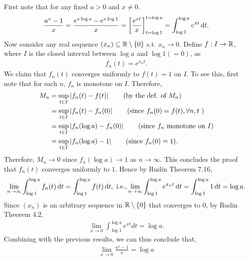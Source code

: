 \documentclass[12pt]{article}
\begin{document}
\begin{fproof}[1(a)]
 First note that for any fixed \(a > 0\) and \(x \neq 0\).
 \begin{align*}
    \frac{a^x - 1}{x} = \frac{e^{x \log a} - e^{x \log 1}}{x} = \left[ \frac{e^{xt}}{x} \right]_{t= \log 1}^{t= \log a} = \int_{\log 1}^{\log a} e^{x t} \mathop{}\!\mathrm{d} t.
 \end{align*}
 Now consider any real sequence \((x_n) \subseteq \mathbb {R} \setminus \{0\}\) s.t. \(x_n \to 0\).
 Define \(f : I \to \mathbb {R}\), where \(I\) is the closed interval between \(\log a\) and \(\log 1(=0)\), as
 \begin{align*}
    f_n(t) = e^{x_n t}.
 \end{align*}
 We claim that \(f_n(t)\) converges uniformly to \(f(t) = 1\) on \(I\).
 To see this, first note that for each \(n\), \(f_n\) is monotone on \(I\).
 Therefore,
 \begin{align*}
    M_n &= \sup_{t \in I} \left\lvert f_n(t) - f(t) \right\rvert \tag{by the def. of \(M_n\)}\\
    &= \sup_{t \in I} \left\lvert f_n(t) - f_n(0) \right\rvert \tag{since \(f_n(0) = f(t), \forall n,t\) }\\
    &= \sup_{t \in I} \left\lvert f_n(\log a) - f_n(0) \right\rvert \tag{since \(f_n\) monotone on \(I\)}\\
    &=\sup_{t \in I} \left\lvert f_n(\log a) - 1 \right\rvert \tag{since \(f_n(0) = 1\)}.
 \end{align*}
 Therefore, \(M_n \to 0\) since \(f_n(\log a) \to 1\) as \(n \to \infty\).
 This concludes the proof that \(f_n(t)\) converges uniformly to \(1\).
 Hence by Rudin Theorem 7.16,
 \begin{align*}
    \lim_{n\to \infty} \int_{\log 1}^{\log a} f_n(t) \mathop{}\!\mathrm{d} t = \int_{\log 1}^{\log a} f(t) \mathop{}\!\mathrm{d} t, \text{ i.e.,}
    \lim_{n\to \infty} \int_{\log 1}^{\log a} e^{x_n t} \mathop{}\!\mathrm{d} t = \int_{\log 1}^{\log a} 1 \mathop{}\!\mathrm{d} t = \log a.
 \end{align*}
Since \((x_n)\) is an arbitrary sequence in \(\mathbb {R} \setminus \{0\}\) that converges to \(0\), by Rudin Theorem 4.2,
\begin{align*}
    \lim_{x \to 0} \int_{\log 1}^{\log a} e^{xt} 
    dt = \log a.
\end{align*}
Combining with the previous results, we can thus conclude that,
\begin{align*}
    \lim_{x \to 0} \frac{a^x - 1}{x} = \log a
\end{align*}
\end{fproof}

\begin{fproof}[1(b)]
 
\end{fproof}
\end{document}
